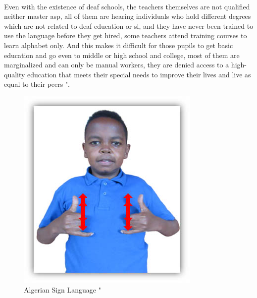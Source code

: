 \paragraph{}
Even with the existence of deaf schools, the teachers themselves are not qualified neither master \ac{asp}, all of them are hearing individuals who hold different degrees which are not related to deaf education or \ac{sl}, and they have never been trained to use the language before they get hired, some teachers attend training courses to learn alphabet only. And this makes it difficult for those pupils to get basic education and go even to middle or high school and college, most of them are marginalized and can only be manual workers, they are denied access to a high-quality education that meets their special needs to improve their lives and live as equal to their peers "\cite{chalenges}.
\begin{figure}[h]
	\centering
	\includegraphics[width=0.8\linewidth]{images/AlgerianSignLanguage}
	\caption{Algerian Sign Language "\cite{asp_img}}
	\label{fig:algeriansignlanguage}
\end{figure}